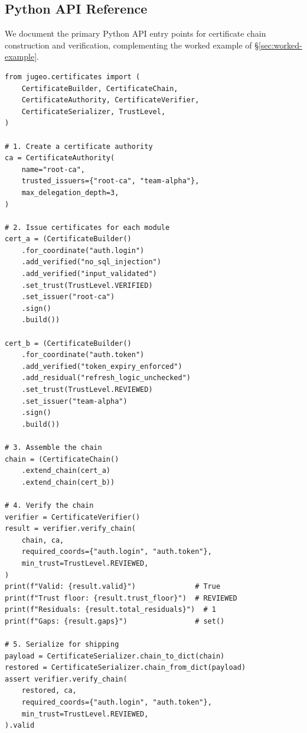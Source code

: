 \documentclass[11pt]{article}
\begin{document}
\subsection{Python API Reference}\label{sec:api-ref}

We document the primary Python API entry points for certificate chain
construction and verification, complementing the worked example of
\S\ref{sec:worked-example}.

\begin{lstlisting}[style=jugeo-python, caption={Complete chain construction and verification workflow.}]
from jugeo.certificates import (
    CertificateBuilder, CertificateChain,
    CertificateAuthority, CertificateVerifier,
    CertificateSerializer, TrustLevel,
)

# 1. Create a certificate authority
ca = CertificateAuthority(
    name="root-ca",
    trusted_issuers={"root-ca", "team-alpha"},
    max_delegation_depth=3,
)

# 2. Issue certificates for each module
cert_a = (CertificateBuilder()
    .for_coordinate("auth.login")
    .add_verified("no_sql_injection")
    .add_verified("input_validated")
    .set_trust(TrustLevel.VERIFIED)
    .set_issuer("root-ca")
    .sign()
    .build())

cert_b = (CertificateBuilder()
    .for_coordinate("auth.token")
    .add_verified("token_expiry_enforced")
    .add_residual("refresh_logic_unchecked")
    .set_trust(TrustLevel.REVIEWED)
    .set_issuer("team-alpha")
    .sign()
    .build())

# 3. Assemble the chain
chain = (CertificateChain()
    .extend_chain(cert_a)
    .extend_chain(cert_b))

# 4. Verify the chain
verifier = CertificateVerifier()
result = verifier.verify_chain(
    chain, ca,
    required_coords={"auth.login", "auth.token"},
    min_trust=TrustLevel.REVIEWED,
)
print(f"Valid: {result.valid}")              # True
print(f"Trust floor: {result.trust_floor}")  # REVIEWED
print(f"Residuals: {result.total_residuals}")  # 1
print(f"Gaps: {result.gaps}")                # set()

# 5. Serialize for shipping
payload = CertificateSerializer.chain_to_dict(chain)
restored = CertificateSerializer.chain_from_dict(payload)
assert verifier.verify_chain(
    restored, ca,
    required_coords={"auth.login", "auth.token"},
    min_trust=TrustLevel.REVIEWED,
).valid
\end{lstlisting}
\end{document}
